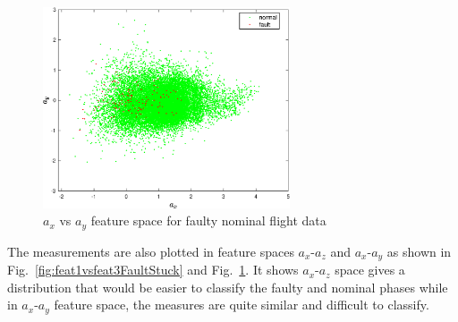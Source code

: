 \begin{figure}
\begin{center}
\includegraphics[width=0.65\textwidth]{figures/feat1vsfeat2FaultStuck}    %
\caption{$a_x$ vs $a_y$ feature space for faulty nominal flight data} 
\label{fig:feat1vsfeat2FaultStuck}
\end{center}
\end{figure}


The measurements are also plotted in feature spaces $a_x$-$a_z$ and $a_x$-$a_y$ as shown in Fig.~\ref{fig:feat1vsfeat3FaultStuck} and Fig.~\ref{fig:feat1vsfeat2FaultStuck}. 
It shows $a_x$-$a_z$ space gives a distribution that would be easier to classify the faulty and nominal phases while in $a_x$-$a_y$ feature space, the measures are quite similar and difficult to classify.


